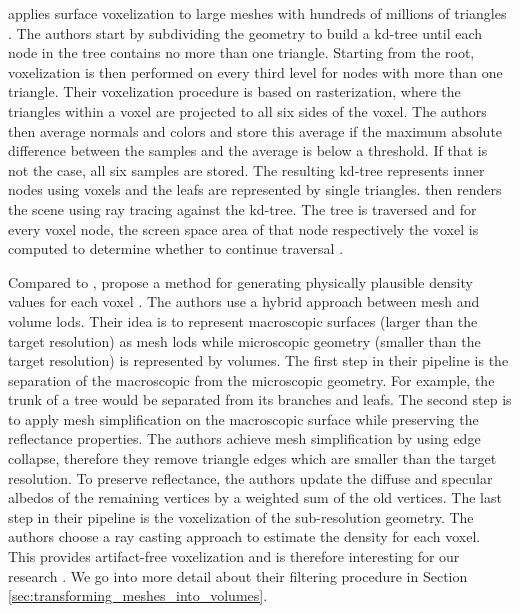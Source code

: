 \citeauthor{afra_voxel_lods} applies surface voxelization to large meshes with hundreds of millions of triangles \cite{afra_voxel_lods}.
The authors start by subdividing the geometry to build a kd-tree until each node in the tree contains no more than one triangle.
Starting from the root, voxelization is then performed on every third level for nodes with more than one triangle.
Their voxelization procedure is based on rasterization, where the triangles within a voxel are projected to all six sides of the voxel.
The authors then average normals and colors and store this average if the maximum absolute difference between the samples and the average is below a threshold.
If that is not the case, all six samples are stored.
The resulting kd-tree represents inner nodes using voxels and the leafs are represented by single triangles.
\citeauthor{afra_voxel_lods} then renders the scene using ray tracing against the kd-tree.
The tree is traversed and for every voxel node, the screen space area of that node respectively the voxel is computed to determine whether to continue traversal \cite{afra_voxel_lods}.

Compared to \citeauthor{afra_voxel_lods}, \citeauthor{hybrid_mesh_volume_lods} propose a method for generating physically plausible density values for each voxel \cite{hybrid_mesh_volume_lods}.
The authors use a hybrid approach between mesh and volume \acp{lod}.
Their idea is to represent macroscopic surfaces (larger than the target resolution) as mesh \acsp{lod} while microscopic geometry (smaller than the target resolution) is represented by volumes.
The first step in their pipeline is the separation of the macroscopic from the microscopic geometry.
For example, the trunk of a tree would be separated from its branches and leafs.
The second step is to apply mesh simplification on the macroscopic surface while preserving the reflectance properties.
The authors achieve mesh simplification by using edge collapse, therefore they remove triangle edges which are smaller than the target resolution.
To preserve reflectance, the authors update the diffuse and specular albedos of the remaining vertices by a weighted sum of the old vertices.
The last step in their pipeline is the voxelization of the sub-resolution geometry.
The authors choose a ray casting approach to estimate the density for each voxel.
This provides artifact-free voxelization and is therefore interesting for our research \cite{hybrid_mesh_volume_lods}.
We go into more detail about their filtering procedure in Section \ref{sec:transforming_meshes_into_volumes}.






